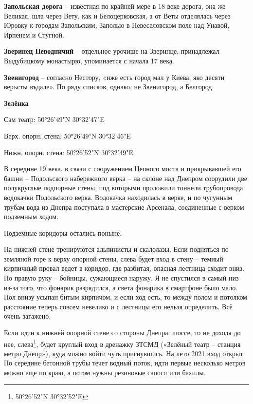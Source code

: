 \medskip

\textbf{Запольская дорога} – известная по крайней мере в 18 веке дорога, она же Великая, шла через Вету, как и Белоцерковская, а от Веты отделялась через Юровку к городам Запольским, Заполью в Невеселовском поле над Унавой, Ирпенем и Стугной.\\

\medskip

\textbf{Зверинец Неводничий} – отдельное урочище на Зверинце, принадлежал Выдубицкому монастырю, упоминается с начала 17 века.\\

\medskip

\textbf{Звенигород} – согласно Нестору, «иже есть город мал у Киева, яко десяти веръсты въдале». По ряду списков, однако, не Звенигород, а Белгород.\\

\medskip

\textbf{Зелёнка}

Сам театр: 50°26'49"N 30°32'47"E

Верх. опорн. стена: 50°26'49"N 30°32'46"E

Нижн. опорн. стена: 50°26'52"N 30°32'49"E

В середине 19 века, в связи с сооружением Цепного моста и прикрывавшей его башни – Подольского набережного верка – на склоне над Днепром соорудили две полукруглые подпорные стены, под которыми проложили тоннели трубопровода водокачки Подольского верка. Водокачка находилась в верке, и по чугунным трубам вода из Днепра поступала в мастерские Арсенала, соединенные с верком подземным ходом. 

Подземные коридоры остались поныне. 

На нижней стене тренируются альпинисты и скалолазы. Если подняться по земляной горе к верху опорной стены, слева будет вход в стену – темный кирпичный провал ведет в коридор, где разбитая, опасная лестница сходит вниз. По правую руку – бойницы, сужающиеся наружу. Я не спустился в самый низ из-за того, что фонарик разрядился, а света фонарика в смартфоне было мало. Пол внизу усыпан битым кирпичом, и если ход есть, то между полом и потолком расстояние теперь совсем невелико и с лестницы его нельзя определить. Всё очень загажено. 

Если идти к нижней опорной стене со стороны Днепра, шоссе, то не доходя до нее, слева\footnote{ 50°26'52"N 30°32'52"E}, будет круглый вход в дренажку ЗТСМД («Зелёный театр – станция метро Днепр»), куда можно войти чуть пригнувшись. На лето 2021 вход открыт. По середине бетонной трубы течет водный поток, идти первые несколько метров можно еще по краю, а потом нужны резиновые сапоги или бахилы.


